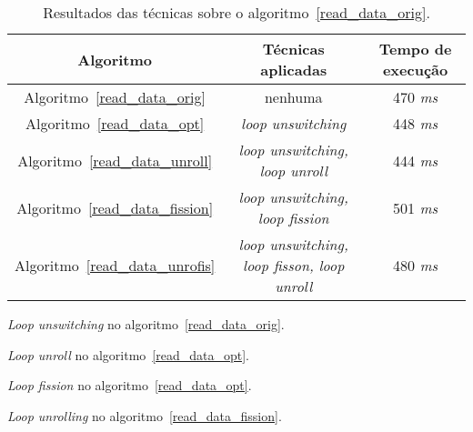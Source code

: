\begin{table}[H]
  \caption{Resultados das técnicas sobre o algoritmo~\ref{read_data_orig}.}
  \label{tabela_read_data}
\begin{center}
  \begin{tabular}{c|c|c}
    Algoritmo & Técnicas aplicadas & Tempo de execução\\
    \hline
    Algoritmo~\ref{read_data_orig} & nenhuma & 470 \textit{ms} \\
    \hline
    Algoritmo~\ref{read_data_opt} & \textit{loop unswitching} & 448 \textit{ms} \\
    \hline
    Algoritmo~\ref{read_data_unroll} & \textit{loop unswitching, loop unroll} & 444 \textit{ms} \\
    \hline
    Algoritmo~\ref{read_data_fission} & \textit{loop unswitching, loop fission} & 501 \textit{ms} \\
    \hline
  Algoritmo~\ref{read_data_unrofis} & \textit{loop unswitching, loop fisson, loop unroll} &  480 \textit{ms} \\
    \hline
  \end{tabular}
\end{center}
\end{table}


\begin{algorithm}[H]
  \caption{\textit{Loop unswitching} no algoritmo~\ref{read_data_orig}.}
    \label{read_data_opt}

\end{algorithm}

\begin{algorithm}[H]
  \caption{\textit{Loop unroll} no algoritmo~\ref{read_data_opt}.}
    \label{read_data_unroll}

\end{algorithm}

\begin{algorithm}[H]
  \caption{\textit{Loop fission} no algoritmo~\ref{read_data_opt}.}
    \label{read_data_fission}

\end{algorithm}

\begin{algorithm}[H]
  \caption{\textit{Loop unrolling} no algoritmo~\ref{read_data_fission}.}
    \label{read_data_unrofis}

\end{algorithm}

